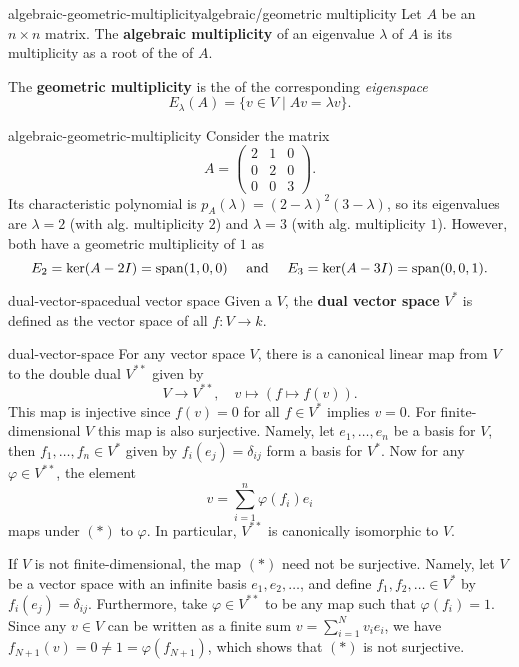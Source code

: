 \begin{topic}{algebraic-geometric-multiplicity}{algebraic/geometric multiplicity}
    Let $A$ be an $n \times n$ matrix. The \textbf{algebraic multiplicity} of an eigenvalue $\lambda$ of $A$ is its multiplicity as a root of the  of $A$.
    
    The \textbf{geometric multiplicity} is the  of the corresponding \textit{eigenspace}
    \[ E_\lambda(A) = \{ v \in V \mid A v = \lambda v \} . \]
\end{topic}

\begin{example}{algebraic-geometric-multiplicity}
    Consider the matrix
    \[ A = \begin{pmatrix} 2 & 1 & 0 \\ 0 & 2 & 0 \\ 0 & 0 & 3 \end{pmatrix} . \]
    Its characteristic polynomial is $p_A(\lambda) = (2 - \lambda)^2 (3 - \lambda)$, so its eigenvalues are $\lambda = 2$ (with alg. multiplicity $2$) and $\lambda = 3$ (with alg. multiplicity $1$). However, both have a geometric multiplicity of $1$ as
    \[ E_2 = \ker(A - 2I) = \textup{span}(1, 0, 0) \quad \textup{ and } \quad E_3 = \ker(A - 3I) = \textup{span}(0, 0, 1) . \]
\end{example}

\begin{topic}{dual-vector-space}{dual vector space}
    Given a  $V$, the \textbf{dual vector space} $V^*$ is defined as the vector space of all  $f \colon V \to k$.
\end{topic}

\begin{example}{dual-vector-space}
    For any vector space $V$, there is a canonical linear map from $V$ to the double dual $V^{**}$ given by
    \[ V \to V^{**}, \quad v \mapsto (f \mapsto f(v)) . \tag{$(*)$} \]
    This map is injective since $f(v) = 0$ for all $f \in V^*$ implies $v = 0$. For finite-dimensional $V$ this map is also surjective. Namely, let $e_1, \ldots, e_n$ be a basis for $V$, then $f_1, \ldots, f_n \in V^*$ given by $f_i(e_j) = \delta_{ij}$ form a basis for $V^*$. Now for any $\varphi \in V^{**}$, the element
    \[ v = \sum_{i = 1}^{n} \varphi(f_i) e_i \]
    maps under $(*)$ to $\varphi$. In particular, $V^{**}$ is canonically isomorphic to $V$.
    
    If $V$ is not finite-dimensional, the map $(*)$ need not be surjective. Namely, let $V$ be a vector space with an infinite basis $e_1, e_2, \ldots$, and define $f_1, f_2, \ldots \in V^*$ by $f_i(e_j) = \delta_{ij}$. Furthermore, take $\varphi \in V^{**}$ to be any map such that $\varphi(f_i) = 1$. Since any $v \in V$ can be written as a finite sum $v = \sum_{i = 1}^{N} v_i e_i$, we have $f_{N + 1}(v) = 0 \ne 1 = \varphi(f_{N + 1})$, which shows that $(*)$ is not surjective.
\end{example}

